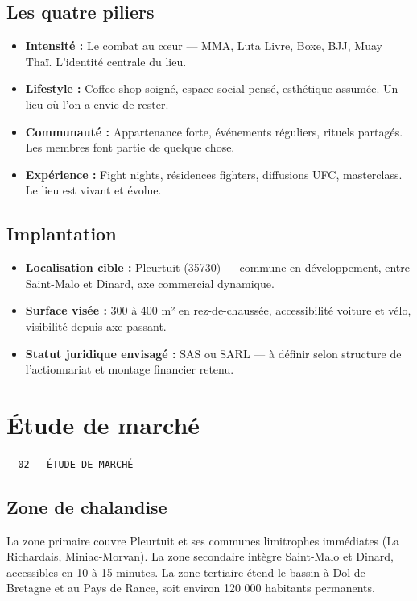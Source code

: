 \documentclass[11pt, a4paper]{article}
\newcommand{\eyebrow}[1]{%
  \vspace{4pt}
  {\small\color{fc-ink3}\texttt{— #1}}
  \vspace{2pt}
}
\begin{document}
\subsection{Les quatre piliers}

\begin{itemize}
  \item \textbf{Intensité :} Le combat au cœur — MMA, Luta Livre, Boxe, BJJ, Muay Thaï. L'identité centrale du lieu.
  \item \textbf{Lifestyle :} Coffee shop soigné, espace social pensé, esthétique assumée. Un lieu où l'on a envie de rester.
  \item \textbf{Communauté :} Appartenance forte, événements réguliers, rituels partagés. Les membres font partie de quelque chose.
  \item \textbf{Expérience :} Fight nights, résidences fighters, diffusions UFC, masterclass. Le lieu est vivant et évolue.
\end{itemize}

\subsection{Implantation}

\begin{itemize}
  \item \textbf{Localisation cible :} Pleurtuit (35730) — commune en développement, entre Saint-Malo et Dinard, axe commercial dynamique.
  \item \textbf{Surface visée :} 300 à 400 m² en rez-de-chaussée, accessibilité voiture et vélo, visibilité depuis axe passant.
  \item \textbf{Statut juridique envisagé :} SAS ou SARL — à définir selon structure de l'actionnariat et montage financier retenu.
\end{itemize}

\section{Étude de marché}
\eyebrow{02 — ÉTUDE DE MARCHÉ}

\subsection{Zone de chalandise}

La zone primaire couvre Pleurtuit et ses communes limitrophes immédiates (La Richardais, Miniac-Morvan). La zone secondaire intègre Saint-Malo et Dinard, accessibles en 10 à 15 minutes. La zone tertiaire étend le bassin à Dol-de-Bretagne et au Pays de Rance, soit environ 120 000 habitants permanents.
\end{document}
